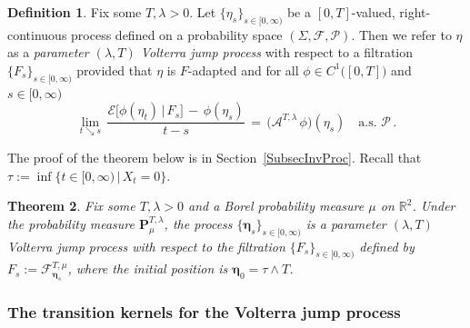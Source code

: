 \documentclass[10pt]{article}
\numberwithin{equation}{section}
\newtheorem{theorem}{Theorem}[section]
\theoremstyle{definition}
\newtheorem{definition}[theorem]{Definition}
\newcommand{\R}{{\mathbb R}}
\begin{document}
\begin{definition}\label{DefSub}  Fix some $T,\lambda>0$. Let $\{ \eta_s \}_{s\in [0,\infty)}$ be a $[0,T]$-valued, right-continuous process  defined on a probability space $(\Sigma, \mathcal{F},\mathcal{P})$.  Then we refer to $\eta$ as a \textit{parameter $(\lambda,T)$ Volterra jump process} with respect to a filtration  $\{ F_s \}_{s\in [0,\infty)}$ provided that  $\eta$ is  $F$-adapted and for all $\phi\in C^1\big([0,T]\big)$ and $s\in [0,\infty)$
$$\lim_{t\searrow s} \,\frac{\mathcal{E}\big[\phi( \eta_t ) \,\big|\, F_s  \big]\,-\,\phi( \eta_s )}{t-s}\,=\, \big(\mathcal{A}^{T,\lambda}\,\phi\big)(\eta_s) \quad \text{a.s.\  $\mathcal{P}$} \,.$$
\end{definition}
The proof of the theorem below is in Section~\ref{SubsecInvProc}.  Recall that  $\tau:=\inf\big\{t\in [0,\infty)\,\big|\, X_t=0 \big\}$.
\begin{theorem}\label{ThmLocalTimeToLEVY} Fix some $T,\lambda>0$ and a Borel probability measure $\mu$ on $\R^2$.  Under the probability measure $\mathbf{P}_{\mu}^{T,\lambda}$, the process $\{\boldsymbol{\eta}_s\}_{s\in [0,\infty)}$ is a parameter $(\lambda,T)$ Volterra jump process with respect to the filtration $\{F_s\}_{s\in [0,\infty)}$ defined by $ F_s:=\mathscr{F}_{\boldsymbol{\eta}_s}^{T,\mu}$, where the initial position is $\boldsymbol{\eta}_0=\tau \wedge T$.
\end{theorem}


 \subsubsection{The transition kernels for the Volterra jump process}\label{SubsectionDickman}
\end{document}
